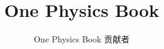 \documentclass[11pt,a4paper,twoside,openany]{book}
\title{One Physics Book}
\author{One Physics Book 贡献者}
\date{\bookdate}
\begin{document}
\frontmatter




\tableofcontents

\mainmatter



\appendix
\part{\omsolutionspart}


\backmatter
\printindex
\end{document}
